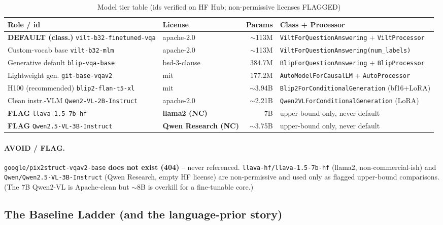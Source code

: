 \documentclass[12pt,a4paper]{article}
\begin{document}
\begin{table}[H]
\centering
\caption{Model tier table (ids verified on HF Hub; non-permissive licenses FLAGGED)}
\small
\setlength{\tabcolsep}{4pt}
\begin{tabularx}{\linewidth}{@{} p{4.0cm} p{2.6cm} r L @{}}
\toprule
\textbf{Role / id} & \textbf{License} & \textbf{Params} & \textbf{Class + Processor} \\
\midrule
\textbf{DEFAULT (class.)} \texttt{vilt-b32-finetuned-vqa} & apache-2.0 & $\sim$113M & \texttt{ViltForQuestionAnswering} + \texttt{ViltProcessor} \\
Custom-vocab base \texttt{vilt-b32-mlm} & apache-2.0 & $\sim$113M & \texttt{ViltForQuestionAnswering(num\_labels)} \\
Generative default \texttt{blip-vqa-base} & bsd-3-clause & 384.7M & \texttt{BlipForQuestionAnswering} + \texttt{BlipProcessor} \\
Lightweight gen. \texttt{git-base-vqav2} & mit & 177.2M & \texttt{AutoModelForCausalLM} + \texttt{AutoProcessor} \\
H100 (recommended) \texttt{blip2-flan-t5-xl} & mit & $\sim$3.94B & \texttt{Blip2ForConditionalGeneration} (bf16+LoRA) \\
Clean instr.-VLM \texttt{Qwen2-VL-2B-Instruct} & apache-2.0 & $\sim$2.21B & \texttt{Qwen2VLForConditionalGeneration} (LoRA) \\
\textbf{FLAG} \texttt{llava-1.5-7b-hf} & \textbf{llama2 (NC)} & 7B & upper-bound only, never default \\
\textbf{FLAG} \texttt{Qwen2.5-VL-3B-Instruct} & \textbf{Qwen Research (NC)} & $\sim$3.75B & upper-bound only, never default \\
\bottomrule
\end{tabularx}
\end{table}

\paragraph{AVOID / FLAG.} \texttt{google/pix2struct-vqav2-base} \textbf{does not exist (404)} -- never referenced. \texttt{llava-hf/llava-1.5-7b-hf} (llama2, non-commercial-ish) and \texttt{Qwen/Qwen2.5-VL-3B-Instruct} (Qwen Research, empty HF license) are non-permissive and used only as flagged upper-bound comparisons. (The 7B Qwen2-VL is Apache-clean but $\sim$8B is overkill for a fine-tunable core.)

\subsection{The Baseline Ladder (and the language-prior story)}
\end{document}
